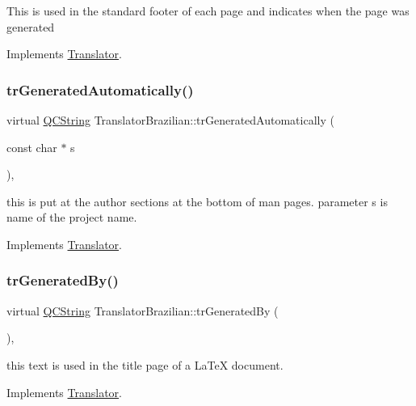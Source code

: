 This is used in the standard footer of each page and indicates when the page was generated 

Implements \mbox{\hyperlink{class_translator}{Translator}}.

\mbox{\label{class_translator_brazilian_af6c42188b3c8dace795837dd044c92e4}} 
\subsubsection{\texorpdfstring{trGeneratedAutomatically()}{trGeneratedAutomatically()}}
{\footnotesize\ttfamily virtual \mbox{\hyperlink{class_q_c_string}{Q\+C\+String}} Translator\+Brazilian\+::tr\+Generated\+Automatically (\begin{DoxyParamCaption}\item[{const char $\ast$}]{s }\end{DoxyParamCaption})\hspace{0.3cm}{\ttfamily [inline]}, {\ttfamily [virtual]}}

this is put at the author sections at the bottom of man pages. parameter s is name of the project name. 

Implements \mbox{\hyperlink{class_translator}{Translator}}.

\mbox{\label{class_translator_brazilian_ad3ef2ecbe70ed69bcef49107733892d1}} 
\subsubsection{\texorpdfstring{trGeneratedBy()}{trGeneratedBy()}}
{\footnotesize\ttfamily virtual \mbox{\hyperlink{class_q_c_string}{Q\+C\+String}} Translator\+Brazilian\+::tr\+Generated\+By (\begin{DoxyParamCaption}{ }\end{DoxyParamCaption})\hspace{0.3cm}{\ttfamily [inline]}, {\ttfamily [virtual]}}

this text is used in the title page of a La\+TeX document. 

Implements \mbox{\hyperlink{class_translator}{Translator}}.

